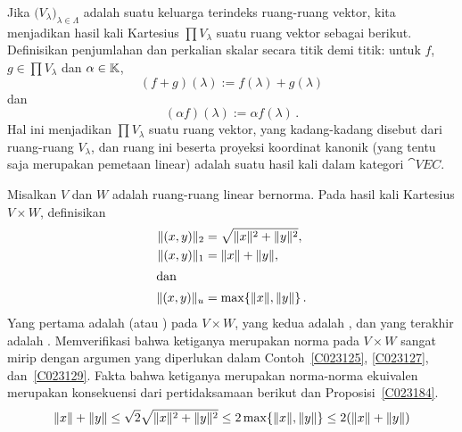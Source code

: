 \begin{exam}\label{C015544} Jika $\bigl(V_\lambda\bigr)_{\lambda \in \Lambda}$ adalah suatu keluarga terindeks
ruang-ruang vektor, kita menjadikan hasil kali Kartesius $\prod V_\lambda$ suatu ruang
vektor sebagai berikut. Definisikan penjumlahan dan perkalian skalar secara titik demi titik: untuk $f$, $g \in
\prod V_\lambda$ dan $\alpha \in \mathbb{K}$,
  \[ (f + g)(\lambda) := f(\lambda) + g(\lambda)  \]
dan
  \[ (\alpha f)(\lambda) := \alpha f(\lambda) \,. \]
Hal ini menjadikan $\prod V_\lambda$ suatu ruang vektor, yang kadang-kadang disebut
 dari ruang-ruang $V_\lambda$, dan ruang ini beserta proyeksi
koordinat kanonik (yang tentu saja merupakan pemetaan linear) adalah suatu
hasil kali dalam kategori $\cat{VEC}$.
\end{exam}

\begin{exam}\label{C023411} Misalkan $V$ dan $W$ adalah ruang-ruang linear bernorma. Pada hasil kali Kartesius
$V \times W$, definisikan
 \begin{align*}
    \lVert(x,y)\rVert_2 &= \sqrt{\lVert x\rVert^2 + \lVert y\rVert^2},  \\
    \lVert(x,y)\rVert_1 &= \lVert x\rVert + \lVert y\rVert,  \\
   \intertext{dan}
    \lVert(x,y)\rVert_u &= \max\{\lVert x\rVert, \lVert y\rVert\}\,.
 \end{align*}
Yang pertama adalah
 (atau
) pada $V \times W$, yang kedua adalah
, dan yang terakhir adalah
. Memverifikasi bahwa ketiganya merupakan norma pada $V \times W$ sangat mirip dengan
argumen yang diperlukan dalam Contoh~\ref{C023125}, \ref{C023127}, dan~\ref{C023129}. Fakta bahwa
ketiganya merupakan norma-norma ekuivalen merupakan konsekuensi dari pertidaksamaan berikut dan
Proposisi~\ref{C023184}.
   \[ \lVert x\rVert + \lVert y\rVert \le \sqrt 2 \sqrt{\lVert x\rVert^2 + \lVert y\rVert^2} \le 2 \max\{\lVert x\rVert,\lVert y\rVert\} \le 2(\lVert x\rVert + \lVert y\rVert) \]
\end{exam}

